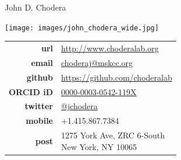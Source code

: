 \documentclass[10pt]{article}
\begin{document}
\reversemarginpar
{\selectfont \LARGE John D. Chodera}\\[1cm]

\vspace{-0.5in}

\begin{minipage}[t]{2.5in}
\texttt{[image: images/john\_chodera\_wide.jpg]} %
\end{minipage}
\quad
\begin{minipage}[t]{3in}
\small
\begin{tabular}{rl}
{\bf url} & \href{http://www.choderalab.org}{http://www.choderalab.org}\\[0.05in]
{\bf email} & \href{mailto:choderaj@mskcc.org}{choderaj@mskcc.org}\\[0.05in] %
{\bf github} & \href{https://github.com/choderalab}{https://github.com/choderalab}\\[0.05in]
{\bf ORCID iD} & \href{http://orcid.org/0000-0003-0542-119X}{0000-0003-0542-119X}\\[0.05in]
{\bf twitter} & \href{http://twitter.com/jchodera}{@jchodera}\\[0.05in]
{\bf mobile} & +1.415.867.7384\\[0.05in]
{\bf post} & 
\parbox[t]{3.0in}{%
1275 York Ave, ZRC 6-South\\
New York, NY 10065}
\end{tabular}
\end{minipage}

\end{document}
